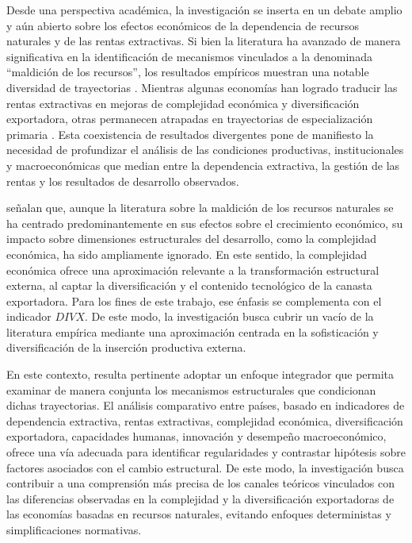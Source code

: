 \documentclass[../../TFM.tex]{subfiles}
\begin{document}
	Desde una perspectiva académica, la investigación se inserta en un debate amplio y aún abierto sobre los efectos económicos de la dependencia de recursos naturales y de las rentas extractivas. Si bien la literatura ha avanzado de manera significativa en la identificación de mecanismos vinculados a la denominada ``maldición de los recursos'', los resultados empíricos muestran una notable diversidad de trayectorias \parencite{Brunnschweiler2006,Brunnschweiler2008,Lebdioui2019}. Mientras algunas economías han logrado traducir las rentas extractivas en mejoras de complejidad económica y diversificación exportadora, otras permanecen atrapadas en trayectorias de especialización primaria \parencite{Lebdioui2019,Ville2013}. Esta coexistencia de resultados divergentes pone de manifiesto la necesidad de profundizar el análisis de las condiciones productivas, institucionales y macroeconómicas que median entre la dependencia extractiva, la gestión de las rentas y los resultados de desarrollo observados.

	\textcite{Ajide2022} señalan que, aunque la literatura sobre la maldición de los recursos naturales se ha centrado predominantemente en sus efectos sobre el crecimiento económico, su impacto sobre dimensiones estructurales del desarrollo, como la complejidad económica, ha sido ampliamente ignorado. En este sentido, la complejidad económica ofrece una aproximación relevante a la transformación estructural externa, al captar la diversificación y el contenido tecnológico de la canasta exportadora. Para los fines de este trabajo, ese énfasis se complementa con el indicador $DIVX$. De este modo, la investigación busca cubrir un vacío de la literatura empírica mediante una aproximación centrada en la sofisticación y diversificación de la inserción productiva externa.

	En este contexto, resulta pertinente adoptar un enfoque integrador que permita examinar de manera conjunta los mecanismos estructurales que condicionan dichas trayectorias. El análisis comparativo entre países, basado en indicadores de dependencia extractiva, rentas extractivas, complejidad económica, diversificación exportadora, capacidades humanas, innovación y desempeño macroeconómico, ofrece una vía adecuada para identificar regularidades y contrastar hipótesis sobre factores asociados con el cambio estructural. De este modo, la investigación busca contribuir a una comprensión más precisa de los canales teóricos vinculados con las diferencias observadas en la complejidad y la diversificación exportadoras de las economías basadas en recursos naturales, evitando enfoques deterministas y simplificaciones normativas.
\end{document}
